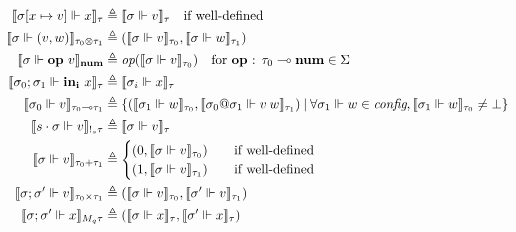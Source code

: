 \begin{definition}
\begin{equation}
\begin{aligned}[c]
  \llbracket \sigma [x \mapsto v] \Vdash x \rrbracket_{\tau} &\triangleq
    \llbracket \sigma \Vdash v \rrbracket_{\tau} \quad \text{if well-defined} \\
  \llbracket \sigma \Vdash (v, w) \rrbracket_{\tau_0 \otimes \tau_1} &\triangleq
    (\llbracket \sigma \Vdash v \rrbracket_{\tau_0}, \llbracket \sigma \Vdash w
    \rrbracket_{\tau_1}) \\
  \llbracket \sigma \Vdash \mathbf{op} \ v \rrbracket_{\textbf{num}}
    &\triangleq \textit{op} (\llbracket \sigma \Vdash v \rrbracket_{\tau_0})
    \quad \text{for \textbf{op} : $\tau_0 \multimap \textbf{num} \in \Sigma$} \\
  \llbracket \sigma_0; \sigma_1 \Vdash \mathbf{in_i} \ x \rrbracket_{\tau}
    &\triangleq \llbracket \sigma_i \Vdash x \rrbracket_{\tau} \\
  \llbracket \sigma_0 \Vdash v \rrbracket_{\tau_0 \multimap \tau_1}
    &\triangleq \{ (\llbracket \sigma_1 \Vdash w \rrbracket_{\tau_0}, \llbracket
    \sigma_0 @ \sigma_1 \Vdash v \> w \rrbracket_{\tau_1}) \> | \>
    \forall \sigma_1 \Vdash w \in \textit{config}, \llbracket \sigma_1 \Vdash w
    \rrbracket_{\tau_0} \not= \bot \} \\
    \llbracket s \cdot \sigma \Vdash v \rrbracket_{!_s \tau} &\triangleq \llbracket
    \sigma \Vdash v \rrbracket_\tau \\
  \llbracket \sigma \Vdash v \rrbracket_{\tau_0 + \tau_1} &\triangleq
    \begin{cases}
      (0, \llbracket \sigma \Vdash v \rrbracket_{\tau_0}) \quad &\text{if well-defined} \\
      (1, \llbracket \sigma \Vdash v \rrbracket_{\tau_1}) \quad &\text{if well-defined}
    \end{cases} \\
  \llbracket \sigma; \sigma' \Vdash v \rrbracket_{\tau_0 \times \tau_1}
    &\triangleq (\llbracket \sigma \Vdash v \rrbracket_{\tau_0}, \llbracket
    \sigma' \Vdash v \rrbracket_{\tau_1}) \\
  \llbracket \sigma; \sigma' \Vdash x \rrbracket_{M_q \tau} &\triangleq
    (\llbracket \sigma \Vdash x \rrbracket_{\tau}, \llbracket \sigma' \Vdash x
    \rrbracket_{\tau}) \\

\end{aligned}
\end{equation}
\end{definition}
